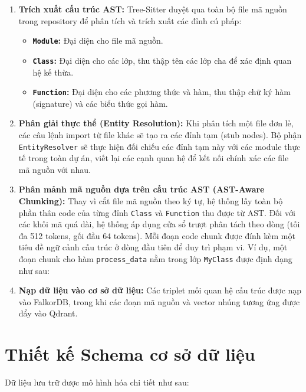 \documentclass[12pt,a4paper,oneside]{report}
\begin{document}
\begin{enumerate}
    \item \textbf{Trích xuất cấu trúc AST:} Tree-Sitter duyệt qua toàn bộ file mã nguồn trong repository để phân tích và trích xuất các đỉnh cú pháp:
    \begin{itemize}
        \item \textbf{\texttt{Module}:} Đại diện cho file mã nguồn.
        \item \textbf{\texttt{Class}:} Đại diện cho các lớp, thu thập tên các lớp cha để xác định quan hệ kế thừa.
        \item \textbf{\texttt{Function}:} Đại diện cho các phương thức và hàm, thu thập chữ ký hàm (signature) và các biểu thức gọi hàm.
    \end{itemize}
    \item \textbf{Phân giải thực thể (Entity Resolution):} Khi phân tích một file đơn lẻ, các câu lệnh import từ file khác sẽ tạo ra các đỉnh tạm (stub nodes). Bộ phận \texttt{EntityResolver} sẽ thực hiện đối chiếu các đỉnh tạm này với các module thực tế trong toàn dự án, viết lại các cạnh quan hệ để kết nối chính xác các file mã nguồn với nhau.
    \item \textbf{Phân mảnh mã nguồn dựa trên cấu trúc AST (AST-Aware Chunking):} Thay vì cắt file mã nguồn theo ký tự, hệ thống lấy toàn bộ phần thân code của từng đỉnh \texttt{Class} và \texttt{Function} thu được từ AST. Đối với các khối mã quá dài, hệ thống áp dụng cửa sổ trượt phân tách theo dòng (tối đa 512 tokens, gối đầu 64 tokens). Mỗi đoạn code chunk được đính kèm một tiêu đề ngữ cảnh cấu trúc ở dòng đầu tiên để duy trì phạm vi. Ví dụ, một đoạn chunk cho hàm \texttt{process\_data} nằm trong lớp \texttt{MyClass} được định dạng như sau:
    \begin{center}
    \end{center}
    \item \textbf{Nạp dữ liệu vào cơ sở dữ liệu:} Các triplet mối quan hệ cấu trúc được nạp vào FalkorDB, trong khi các đoạn mã nguồn và vector nhúng tương ứng được đẩy vào Qdrant.
\end{enumerate}

\section{Thiết kế Schema cơ sở dữ liệu}
Dữ liệu lưu trữ được mô hình hóa chi tiết như sau:
\end{document}
